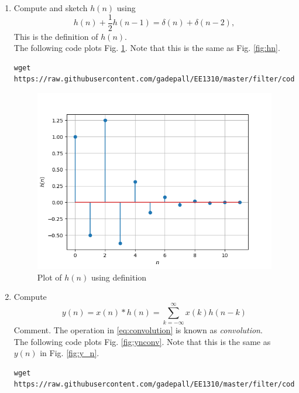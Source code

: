\documentclass[journal,12pt,twocolumn]{IEEEtran}
\theoremstyle{remark}
\renewcommand\thesection{\arabic{section}}
\numberwithin{equation}{subsection}
\begin{document}
\begin{enumerate}[label=\thesection.\arabic*]
\item 
Compute and sketch $h(n)$ using 
\begin{equation}
\label{eq:iir_filter_h}
h(n) + \frac{1}{2}h(n-1) = \delta(n) + \delta(n-2), 
\end{equation}
%
This is the definition of $h(n)$.
\\
\solution The following code plots Fig. \ref{fig:hndef}. Note that this is the same as Fig. 
\ref{fig:hn}. 
%
\begin{lstlisting}
wget https://raw.githubusercontent.com/gadepall/EE1310/master/filter/codes/hndef.py
\end{lstlisting}
\begin{figure}[!ht]
\centering
\includegraphics[width=\columnwidth]{figs/5.4.png}
\caption{Plot of $h(n)$ using definition}
\label{fig:hndef}
\end{figure}
%
\item Compute 
%
\begin{equation}
\label{eq:convolution}
y(n) = x(n)*h(n) = \sum_{k=-\infty}^{\infty}x(k)h(n-k) 
\end{equation} 
%
Comment. The operation in \eqref{eq:convolution} is known as
{\em convolution}.
%
\\
\solution The following code plots Fig. \ref{fig:ynconv}. Note that this is the same as 
$y(n)$ in  Fig. 
\ref{fig:y_n}. 
%
\begin{lstlisting}
wget https://raw.githubusercontent.com/gadepall/EE1310/master/filter/codes/ynconv.py
\end{lstlisting}
\begin{figure}[!ht]
\centering

\end{figure}
\end{enumerate}
\end{document}
